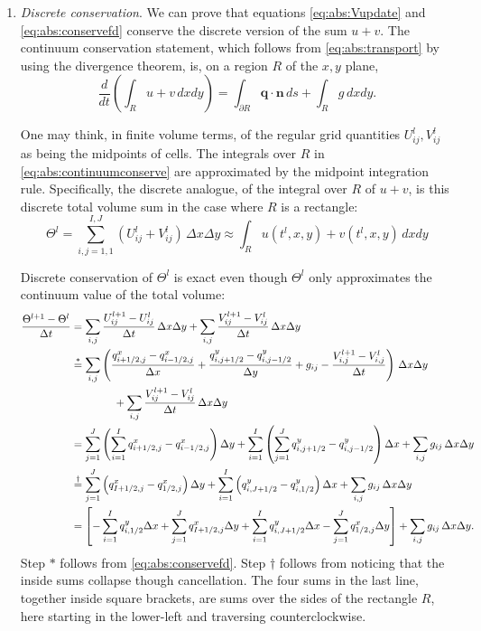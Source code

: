 \documentclass[11pt,final]{amsart}
\newcommand\bn{\mathbf{n}}
\newcommand\bq{\mathbf{q}}
\begin{document}
\begin{enumerate}
\item \emph{Discrete conservation}.  We can prove that equations \eqref{eq:abs:Vupdate} and \eqref{eq:abs:conservefd} conserve the discrete version of the sum $u+v$.  The continuum conservation statement, which follows from \eqref{eq:abs:transport} by using the divergence theorem, is, on a region $R$ of the $x,y$ plane,
\begin{equation}
\frac{d}{dt} \left(\int_R u + v\,dx dy\right) = \int_{\partial R} \bq \cdot \bn\,ds + \int_R g \,dx dy.  \label{eq:abs:continuumconserve}
\end{equation}

One may think, in finite volume terms, of the regular grid quantities $U_{ij}^l,V_{ij}^l$ as being the midpoints of cells.  The integrals over $R$ in \eqref{eq:abs:continuumconserve} are approximated by the midpoint integration rule.  Specifically, the discrete analogue, of the integral over $R$ of $u+v$, is this discrete total volume sum in the case where $R$ is a rectangle:
\begin{equation}
\Theta^l = \sum_{i,j=1,1}^{I,J} \left(U_{ij}^l + V_{ij}^l\right)\,\Delta x \Delta y \approx 
\int_R u(t^l,x,y) + v(t^l,x,y) \,dx dy\end{equation}

Discrete conservation of $\Theta^l$ is exact even though $\Theta^l$ only approximates the continuum value of the total volume:
\begin{align}
\frac{\Theta^{l+1} - \Theta^l}{\Delta t} &= \sum_{i,j} \frac{U_{ij}^{l+1} - U_{ij}^l}{\Delta t} \,\Delta x \Delta y   + \sum_{i,j} \frac{V_{ij}^{l+1} - V_{ij}^l}{\Delta t} \,\Delta x \Delta y   \label{eq:abs:discreteconserve} \\
  &\stackrel{\ast}{=} \sum_{i,j} \left(\frac{q^x_{i+1/2,j} - q^x_{i-1/2,j}}{\Delta x} + \frac{q^y_{i,j+1/2} - q^y_{i,j-1/2}}{\Delta y} + g_{ij} - \frac{V_{i,j}^{l+1} - V_{i,j}^l}{\Delta t}\right) \,\Delta x \Delta y  \notag \\
  &\qquad\qquad + \sum_{i,j} \frac{V_{ij}^{l+1} - V_{ij}^l}{\Delta t} \,\Delta x \Delta y   \notag \\
  &= \sum_{j=1}^{J} \left(\sum_{i=1}^{I}  q^x_{i+1/2,j} - q^x_{i-1/2,j}\right) \Delta y +  \sum_{i=1}^{I} \left(\sum_{j=1}^{J} q^y_{i,j+1/2} - q^y_{i,j-1/2}\right) \Delta x +  \sum_{i,j} g_{ij}\,\Delta x \Delta y  \notag \\
  &\stackrel{\dagger}{=} \sum_{j=1}^{J} \left(q^x_{I+1/2,j} - q^x_{1/2,j}\right) \Delta y +  \sum_{i=1}^{I} \left(q^y_{i,J+1/2} - q^y_{i,1/2}\right) \Delta x +  \sum_{i,j} g_{ij}\,\Delta x \Delta y \notag \\
  &= \left[- \sum_{i=1}^{I}  q^y_{i,1/2} \Delta x + \sum_{j=1}^{J} q^x_{I+1/2,j} \Delta y + \sum_{i=1}^{I} q^y_{i,J+1/2} \Delta x - \sum_{j=1}^{J} q^x_{1/2,j} \Delta y \right]  +  \sum_{i,j} g_{ij}\,\Delta x \Delta y. \notag
\end{align}
Step $\ast$ follows from \eqref{eq:abs:conservefd}.  Step $\dagger$ follows from noticing that the inside sums collapse though cancellation.  The four sums in the last line, together inside square brackets, are sums over the sides of the rectangle $R$, here starting in the lower-left and traversing counterclockwise.


\end{enumerate}
\end{document}
